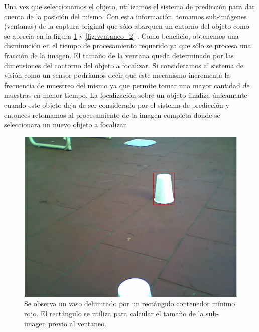 	\indent Una vez que seleccionamos el objeto, utilizamos el sistema de 
	predicci\'on para dar cuenta de la posici\'on del mismo. Con esta 
	informaci\'on, tomamos sub-im\'agenes (ventanas) de la captura original 
	que s\'olo abarquen un entorno del objeto como se aprecia en la figura 
	\ref{fig:ventaneo} y \ref{fig:ventaneo_2} . Como beneficio, 
	obtenemos una 
	disminuci\'on en el tiempo de procesamiento requerido ya que s\'olo se procesa una fracci\'on de 
	la imagen. El tama\~no de la ventana queda determinado por 
	las dimensiones del contorno del objeto a focalizar. Si consideramos 
	al sistema de visi\'on como un sensor podr\'iamos decir que este 
	mecanismo incrementa la frecuencia de muestreo del mismo ya que 
	permite tomar una mayor cantidad de muestras en menor tiempo. La 
	focalizaci\'on sobre un objeto finaliza \'unicamente cuando este objeto 
	deja de ser considerado por el sistema de predicci\'on y entonces 
	retomamos al  procesamiento de la imagen completa donde se 
	seleccionara un nuevo objeto a focalizar. 

\begin{figure}[htpb]
\begin{center}
  \includegraphics[scale=0.4]{vision/figures/ventana-1.png}
\end{center}
  \caption[Ventaneo]{\small Se observa un vaso delimitado por un rect\'angulo 
  contenedor m\'inimo rojo. El rect\'angulo se utiliza para calcular el 
  tama\~no de la sub-imagen previo al ventaneo.}
  \label{fig:ventaneo}
\end{figure}


